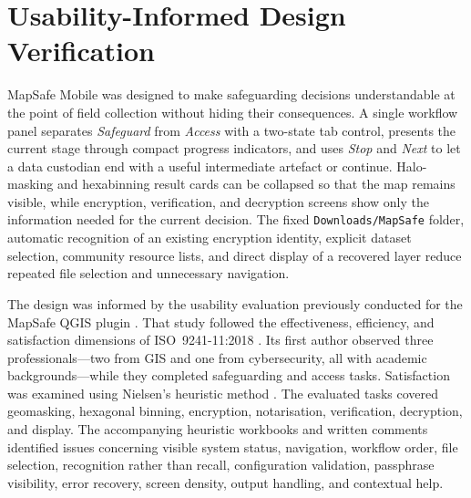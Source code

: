 \documentclass[a4paper,UKenglish,cleveref,autoref,thm-restate]{lipics-v2021}
\newcommand{\resultplaceholder}[1]{\textbf{[RESULT TO INSERT: #1]}}
\begin{document}


\section{Usability-Informed Design Verification}
\label{sec:usability-design}

MapSafe Mobile was designed to make safeguarding decisions understandable at the point of field collection without hiding their consequences. A single workflow panel separates \emph{Safeguard} from \emph{Access} with a two-state tab control, presents the current stage through compact progress indicators, and uses \emph{Stop} and \emph{Next} to let a data custodian end with a useful intermediate artefact or continue. Halo-masking and hexabinning result cards can be collapsed so that the map remains visible, while encryption, verification, and decryption screens show only the information needed for the current decision. The fixed \texttt{Downloads/MapSafe} folder, automatic recognition of an existing encryption identity, explicit dataset selection, community resource lists, and direct display of a recovered layer reduce repeated file selection and unnecessary navigation.

The design was informed by the usability evaluation previously conducted for the MapSafe QGIS plugin \citep{sharma2025mapsafe}. That study followed the effectiveness, efficiency, and satisfaction dimensions of ISO~9241-11:2018 \citep{ISO2018ergonomics}. Its first author observed three professionals---two from GIS and one from cybersecurity, all with academic backgrounds---while they completed safeguarding and access tasks. Satisfaction was examined using Nielsen's heuristic method \citep{nielsen1995conduct}. The evaluated tasks covered geomasking, hexagonal binning, encryption, notarisation, verification, decryption, and display. The accompanying heuristic workbooks and written comments identified issues concerning visible system status, navigation, workflow order, file selection, recognition rather than recall, configuration validation, passphrase visibility, error recovery, screen density, output handling, and contextual help.
\end{document}

